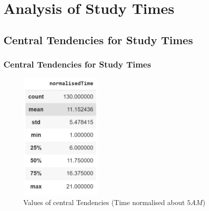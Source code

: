 \documentclass[11pt,]{beamer}
\begin{document}
\section{Analysis of Study Times}

\subsection{Central Tendencies for Study Times}

\begin{frame}

    \frametitle{Central Tendencies for Study Times}
    
    \begin{figure}
		\includegraphics[width=4cm]{DF_Time_of_Study.png}
		\caption{Values of central Tendencies (Time normalised about $5 AM$)}
	\end{figure}
    
\end{frame}
\end{document}

